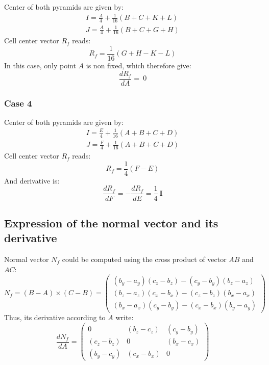 \documentclass[11pt]{article}
\begin{document}
Center of both pyramids are given by:
\begin{subequations}
\begin{gather}
I = \frac{A}{4} + \frac{1}{16} (B + C + K + L) \\
J = \frac{A}{4} + \frac{1}{16} (B + C + G + H)
\end{gather}
\end{subequations} 
Cell center vector $R_f$ reads:
\begin{equation}
R_f = \frac{1}{16} ( G + H - K - L)
\end{equation}
In this case, only point $A$ is non fixed, which therefore give:
\begin{equation}
\frac{d R_f}{d A} = \ 0 
\end{equation}


\subsubsection{Case 4}

Center of both pyramids are given by:
\begin{subequations}
\begin{gather}
I = \frac{E}{4} + \frac{1}{16} (A + B + C + D) \\
J = \frac{F}{4} + \frac{1}{16} (A + B + C + D)
\end{gather}
\end{subequations} 
Cell center vector $R_f$ reads:
\begin{equation}
R_f = \frac{1}{4} (F-E)
\end{equation}
And derivative is:
\begin{equation}
\frac{d R_f}{d F} = - \frac{d R_f}{d E} = \frac{1}{4}\ \boldsymbol{I}
\end{equation}


\subsection{Expression of the normal vector and its derivative}
Normal vector $N_f$ could be computed using the cross product of vector $AB$ and $AC$:
\begin{equation}
N_f = (B-A) \times (C-B) = 
\begin{pmatrix}
(b_y-a_y)(c_z-b_z) - (c_y-b_y)(b_z-a_z)  \\
(b_z-a_z)(c_x-b_x) - (c_z-b_z)(b_x-a_x)  \\
(b_x-a_x)(c_y-b_y) - (c_x-b_x)(b_y-a_y) 
\end{pmatrix}
\end{equation}
Thus, its derivative according to $A$ write:
\begin{equation}
\frac{dN_f}{dA} = 
\begin{pmatrix}
0 & (b_z-c_z) & (c_y-b_y) \\
(c_z-b_z) & 0 & (b_x-c_x) \\
(b_y-c_y) & (c_x-b_x) & 0
\end{pmatrix}
\end{equation}
\end{document}
